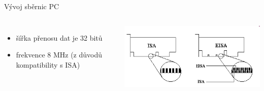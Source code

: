 \documentclass[aspectratio=43]{beamer}
\begin{document}
\begin{frame}{Vývoj sběrnic PC}
\begin{columns}
\begin{itemize}
			\item šířka přenosu dat je 32 bitů
			\item frekvence 8 MHz (z důvodů kompatibility s ISA)
		\end{itemize}
		\includegraphics[width=1\linewidth]{extrahovane_obrazky/img_1_page8_3.png}
	\end{columns}
	
\end{frame}
\end{document}
